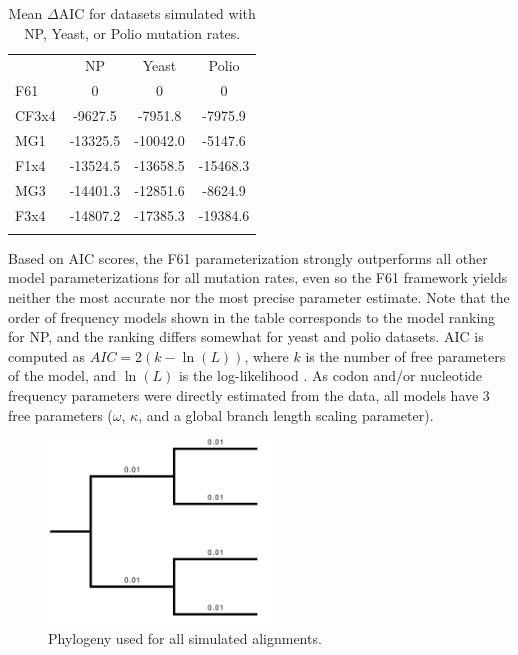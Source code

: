 \documentclass[11pt]{article}
\begin{document}
\begin{table}[htbp]
	\caption {\label{tab:dAIC} Mean $\Delta$AIC for datasets simulated with NP, Yeast, or Polio mutation rates.}
	\begin{tabular}{l c c c}
		\hline\noalign{\smallskip}
		\multicolumn{1}{c}{Frequencies} & NP & Yeast & Polio \\
		\noalign{\smallskip}\hline\noalign{\smallskip}
		F61 & 0 & 0 & 0 \\ 
		CF3x4 & -9627.5 & -7951.8 & -7975.9 \\ 
		MG1 & -13325.5 & -10042.0 & -5147.6 \\ 
		F1x4 & -13524.5 & -13658.5 & -15468.3 \\ 
		MG3 & -14401.3 & -12851.6 & -8624.9 \\ 
		F3x4 & -14807.2 & -17385.3 & -19384.6 \\ 
		\noalign{\smallskip}\hline\noalign{\smallskip} 
	\end{tabular}
	Based on AIC scores, the F61 parameterization strongly outperforms all other model parameterizations for all mutation rates, even so the F61 framework yields neither the most accurate nor the most precise parameter estimate. Note that the order of frequency models shown in the table corresponds to the model ranking for NP, and the ranking differs somewhat for yeast and polio datasets. AIC is computed as $AIC = 2(k - \ln(L))$, where $k$ is the number of free parameters of the model, and $\ln(L)$ is the log-likelihood \cite{Akaike1974,BurnhamAnderson2004}. As codon and/or nucleotide frequency parameters were directly estimated from the data, all models have 3 free parameters ($\omega$, $\kappa$, and a global branch length scaling parameter).
\end{table}

\vspace{2cm}


\begin{figure}[htbp]
	\centerline{\includegraphics[width=6cm]{figures/MainText/simtree.pdf}}
	\caption{\label{tree} Phylogeny used for all simulated alignments.}	
\end{figure}
\end{document}
